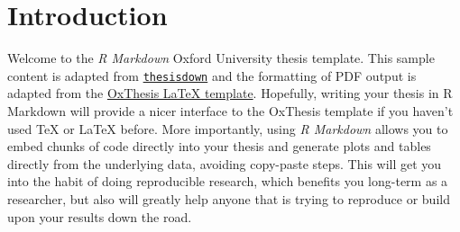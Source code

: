 \documentclass[a4paper, nobind]{templates/iheidthesis}
\begin{document}
\flushbottom

\tableofcontents




\flushbottom

\hypertarget{introduction}{%
\chapter*{Introduction}\label{introduction}}

\adjustmtc

Welcome to the \emph{R Markdown} Oxford University thesis template.
This sample content is adapted from \href{https://github.com/ismayc/thesisdown}{\texttt{thesisdown}} and the formatting of PDF output is adapted from the \href{https://github.com/mcmanigle/OxThesis}{OxThesis LaTeX template}.
Hopefully, writing your thesis in R Markdown will provide a nicer interface to the OxThesis template if you haven't used TeX or LaTeX before.
More importantly, using \emph{R Markdown} allows you to embed chunks of code directly into your thesis and generate plots and tables directly from the underlying data, avoiding copy-paste steps.
This will get you into the habit of doing reproducible research, which benefits you long-term as a researcher, but also will greatly help anyone that is trying to reproduce or build upon your results down the road.
\end{document}
